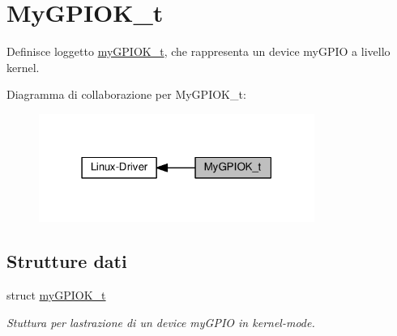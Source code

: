 \hypertarget{group__my_g_p_i_o_k__t}{}\section{My\+G\+P\+I\+O\+K\+\_\+t}
\label{group__my_g_p_i_o_k__t}


Definisce l\textquotesingle{}oggetto \hyperlink{structmy_g_p_i_o_k__t}{my\+G\+P\+I\+O\+K\+\_\+t}, che rappresenta un device my\+G\+P\+IO a livello kernel.  


Diagramma di collaborazione per My\+G\+P\+I\+O\+K\+\_\+t\+:\nopagebreak
\begin{figure}[H]
\begin{center}
\leavevmode
\includegraphics[width=255pt]{group__my_g_p_i_o_k__t}
\end{center}
\end{figure}
\subsection*{Strutture dati}
\begin{DoxyCompactItemize}
\item 
struct \hyperlink{structmy_g_p_i_o_k__t}{my\+G\+P\+I\+O\+K\+\_\+t}
\begin{DoxyCompactList}\small\item\em Stuttura per l\textquotesingle{}astrazione di un device my\+G\+P\+IO in kernel-\/mode. \end{DoxyCompactList}\end{DoxyCompactItemize}
